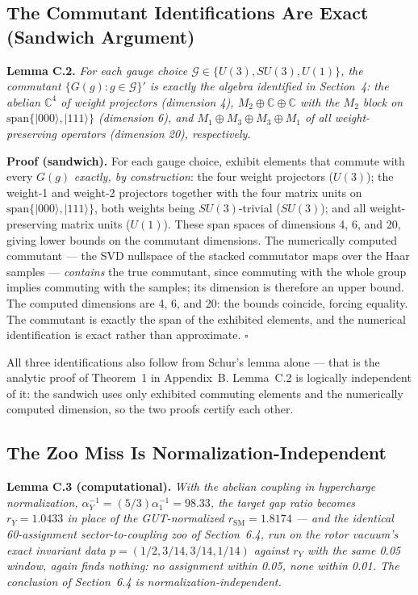 \documentclass[11pt]{article}
\newcommand{\CC}{\mathbb{C}}
\newcommand{\rSM}{r_{\mathrm{SM}}}
\newcommand{\rY}{r_{Y}}
\begin{document}
\subsection{The Commutant Identifications Are Exact (Sandwich Argument)}

\textbf{Lemma C.2.} \emph{For each gauge choice $\mathcal{G} \in \{U(3), SU(3), U(1)\}$, the commutant $\{G(g) : g \in \mathcal{G}\}'$ is exactly the algebra identified in Section~4: the abelian $\CC^4$ of weight projectors (dimension 4), $M_2 \oplus \CC \oplus \CC$ with the $M_2$ block on $\mathrm{span}\{|000\rangle, |111\rangle\}$ (dimension 6), and $M_1 \oplus M_3 \oplus M_3 \oplus M_1$ of all weight-preserving operators (dimension 20), respectively.}

\textbf{Proof (sandwich).} For each gauge choice, exhibit elements that commute with every $G(g)$ \emph{exactly, by construction}: the four weight projectors ($U(3)$); the weight-1 and weight-2 projectors together with the four matrix units on $\mathrm{span}\{|000\rangle, |111\rangle\}$, both weights being $SU(3)$-trivial ($SU(3)$); and all weight-preserving matrix units ($U(1)$). These span spaces of dimensions 4, 6, and 20, giving lower bounds on the commutant dimensions. The numerically computed commutant --- the SVD nullspace of the stacked commutator maps over the Haar samples --- \emph{contains} the true commutant, since commuting with the whole group implies commuting with the samples; its dimension is therefore an upper bound. The computed dimensions are 4, 6, and 20: the bounds coincide, forcing equality. The commutant is exactly the span of the exhibited elements, and the numerical identification is exact rather than approximate. \hfill$\square$

All three identifications also follow from Schur's lemma alone --- that is the analytic proof of Theorem~1 in Appendix~B. Lemma~C.2 is logically independent of it: the sandwich uses only exhibited commuting elements and the numerically computed dimension, so the two proofs certify each other.

\subsection{The Zoo Miss Is Normalization-Independent}

\textbf{Lemma C.3 (computational).} \emph{With the abelian coupling in hypercharge normalization, $\alpha_Y^{-1} = (5/3)\alpha_1^{-1} = 98.33$, the target gap ratio becomes $\rY = 1.0433$ in place of the GUT-normalized $\rSM = 1.8174$ --- and the identical 60-assignment sector-to-coupling zoo of Section~6.4, run on the rotor vacuum's exact invariant data $p = (1/2, 3/14, 3/14, 1/14)$ against $\rY$ with the same 0.05 window, again finds nothing: no assignment within 0.05, none within 0.01. The conclusion of Section~6.4 is normalization-independent.}
\end{document}
